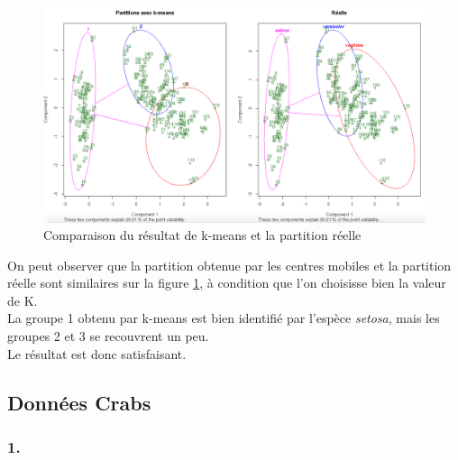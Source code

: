 \documentclass{article}
\begin{document}
\begin{figure}[H]
\centering
\includegraphics[width=13cm]{./img/iris_classification_reelle.png}
\caption{Comparaison du résultat de k-means et la partition réelle}
\label{iris_classification_reelle}
\end{figure}

On peut observer que la partition obtenue par les centres mobiles et la partition réelle sont similaires sur la figure \ref{iris_classification_reelle}, à condition que l'on choisisse bien la valeur de K.\\
La groupe 1 obtenu par k-means est bien identifié par l'espèce \textit{setosa}, mais les groupes 2 et 3 se recouvrent un peu.\\
Le résultat est donc satisfaisant.

\subsection{Données Crabs}

\subsubsection*{1.}
\end{document}
